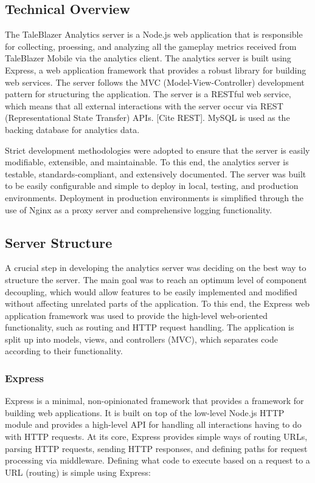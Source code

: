 \subsection{Technical Overview}

The TaleBlazer Analytics server is a Node.js web application that is responsible for collecting, proessing, and analyzing all the gameplay metrics received from TaleBlazer Mobile via the analytics client. The analytics server is built using Express, a web application framework that provides a robust library for building web services. The server follows the MVC (Model-View-Controller) development pattern for structuring the application. The server is a RESTful web service, which means that all external interactions with the server occur via REST (Representational State Transfer) APIs. [Cite REST]. MySQL is used as the backing database for analytics data.

Strict development methodologies were adopted to ensure that the server is easily modifiable, extensible, and maintainable. To this end, the analytics server is testable, standards-compliant, and extensively documented. The server was built to be easily configurable and simple to deploy in local, testing, and production environments. Deployment in production environments is simplified through the use of Nginx as a proxy server and comprehensive logging functionality.

\subsection{Server Structure}

A crucial step in developing the analytics server was deciding on the best way to structure the server. The main goal was to reach an optimum level of component decoupling, which would allow features to be easily implemented and modified without affecting unrelated parts of the application. To this end, the Express web application framework was used to provide the high-level web-oriented functionality, such as routing and HTTP request handling. The application is split up into models, views, and controllers (MVC), which separates code according to their functionality. 

\subsubsection{Express}
Express is a minimal, non-opinionated framework that provides a framework for building web applications. It is built on top of the low-level Node.js HTTP module and provides a high-level API for handling all interactions having to do with HTTP requests. At its core, Express provides simple ways of routing URLs, parsing HTTP requests, sending HTTP responses, and defining paths for request processing via middleware. Defining what code to execute based on a request to a URL (routing) is simple using Express:

